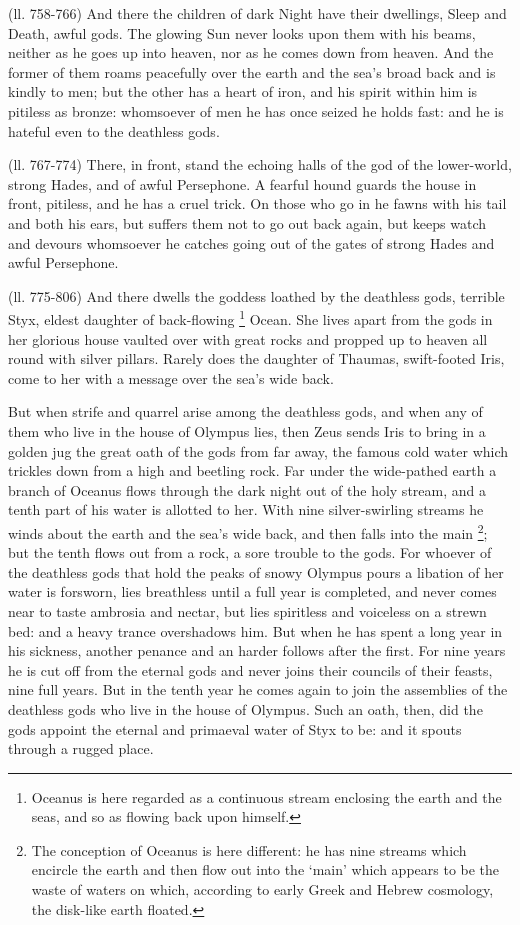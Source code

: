 (ll. 758-766) And there the children of dark Night have their dwellings, Sleep
and Death, awful gods. The glowing Sun never looks upon them with his beams,
neither as he goes up into heaven, nor as he comes down from heaven. And the
former of them roams peacefully over the earth and the sea’s broad back
and is kindly to men; but the other has a heart of iron, and his spirit within
him is pitiless as bronze: whomsoever of men he has once seized he holds fast:
and he is hateful even to the deathless gods.

(ll. 767-774) There, in front, stand the echoing halls of the god of the
lower-world, strong Hades, and of awful Persephone. A fearful hound guards the
house in front, pitiless, and he has a cruel trick. On those who go in he fawns
with his tail and both his ears, but suffers them not to go out back again, but
keeps watch and devours whomsoever he catches going out of the gates of strong
Hades and awful Persephone.

(ll. 775-806) And there dwells the goddess loathed by the deathless gods,
terrible Styx, eldest daughter of back-flowing \footnote{Oceanus is here regarded
as a continuous stream enclosing the earth and the seas, and so as flowing back
upon himself.} Ocean.
She lives apart from the gods in her glorious house vaulted over with great
rocks and propped up to heaven all round with silver pillars. Rarely does the
daughter of Thaumas, swift-footed Iris, come to her with a message over the
sea’s wide back.

But when strife and quarrel arise among the deathless gods, and when any of
them who live in the house of Olympus lies, then Zeus sends Iris to bring in a
golden jug the great oath of the gods from far away, the famous cold water
which trickles down from a high and beetling rock. Far under the wide-pathed
earth a branch of Oceanus flows through the dark night out of the holy stream,
and a tenth part of his water is allotted to her. With nine silver-swirling
streams he winds about the earth and the sea’s wide back, and then falls
into the main \footnote{The conception of Oceanus
is here different: he has nine streams which encircle the earth and then flow
out into the ‘main’ which appears to be the waste of waters on
which, according to early Greek and Hebrew cosmology, the disk-like earth
floated.}; but the tenth flows out from a
rock, a sore trouble to the gods. For whoever of the deathless gods that hold
the peaks of snowy Olympus pours a libation of her water is forsworn, lies
breathless until a full year is completed, and never comes near to taste
ambrosia and nectar, but lies spiritless and voiceless on a strewn bed: and a
heavy trance overshadows him. But when he has spent a long year in his
sickness, another penance and an harder follows after the first. For nine years
he is cut off from the eternal gods and never joins their councils of their
feasts, nine full years. But in the tenth year he comes again to join the
assemblies of the deathless gods who live in the house of Olympus. Such an
oath, then, did the gods appoint the eternal and primaeval water of Styx to be:
and it spouts through a rugged place.

